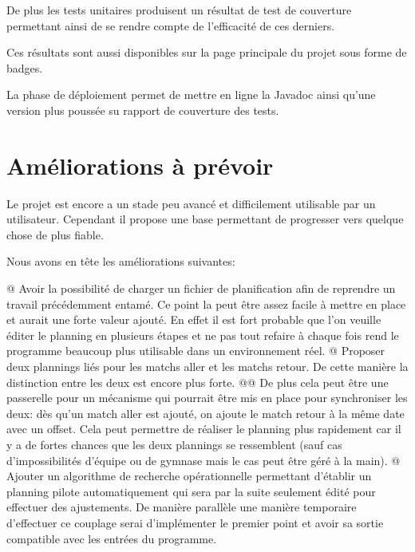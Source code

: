 \documentclass[final, noposter]{polytech/polytech}
\begin{document}
	De plus les tests unitaires produisent un résultat de test de couverture permettant ainsi de se rendre compte de l'efficacité de ces derniers. 
	
	Ces résultats sont aussi disponibles sur la page principale du projet sous forme de badges.
	
	La phase de déploiement permet de mettre en ligne la Javadoc ainsi qu'une version plus poussée su rapport de couverture des tests.

\chapter{Améliorations à prévoir}
	Le projet est encore a un stade peu avancé et difficilement utilisable par un utilisateur.
	Cependant il propose une base permettant de progresser vers quelque chose de plus fiable.
	
	Nous avons en tête les améliorations suivantes:
	\begin{easylist}[itemize]
		@ Avoir la possibilité de charger un fichier de planification afin de reprendre un travail précédemment entamé.
		Ce point la peut être assez facile à mettre en place et aurait une forte valeur ajouté.
		En effet il est fort probable que l'on veuille éditer le planning en plusieurs étapes et ne pas tout refaire à chaque fois rend le programme beaucoup plus utilisable dans un environnement réel.
		@ Proposer deux plannings liés pour les matchs aller et les matchs retour.
		De cette manière la distinction entre les deux est encore plus forte.
		@@ De plus cela peut être une passerelle pour un mécanisme qui pourrait être mis en place pour synchroniser les deux: dès qu'un match aller est ajouté, on ajoute le match retour à la même date avec un offset.
		Cela peut permettre de réaliser le planning plus rapidement car il y a de fortes chances que les deux plannings se ressemblent (sauf cas d'impossibilités d'équipe ou de gymnase mais le cas peut être géré à la main).
		@ Ajouter un algorithme de recherche opérationnelle permettant d'établir un planning pilote automatiquement qui sera par la suite seulement édité pour effectuer des ajustements.
		De manière parallèle une manière temporaire d'effectuer ce couplage serai d'implémenter le premier point et avoir sa sortie compatible avec les entrées du programme.
	\end{easylist}
\end{document}
